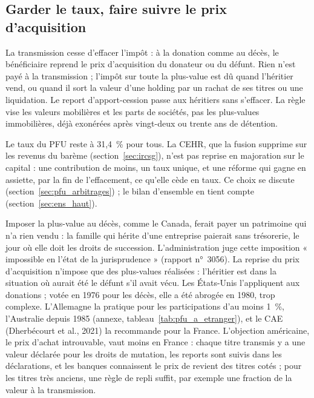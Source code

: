 \subsection{Garder le taux, faire suivre le prix d'acquisition}\label{sec:pfu_proposition}

La transmission cesse d'effacer l'impôt : à la donation comme au décès, le bénéficiaire reprend le prix
d'acquisition du donateur ou du défunt. Rien n'est payé à la transmission ; l'impôt sur toute la plus-value est dû
quand l'héritier vend, ou quand il sort la valeur d'une holding par un rachat de ses titres ou une liquidation. Le
report d'apport-cession passe aux héritiers sans s'effacer. La règle vise les valeurs mobilières et les parts de
sociétés, pas les plus-values immobilières, déjà exonérées après vingt-deux ou trente ans de détention.

Le taux du PFU reste à 31,4~\% pour tous. La CEHR, que la fusion supprime sur les revenus du barème
(section~\ref{sec:ircsg}), n'est pas reprise en majoration sur le capital : une contribution de moins, un taux
unique, et une réforme qui gagne en assiette, par la fin de l'effacement, ce qu'elle cède en taux. Ce choix se
discute (section~\ref{sec:pfu_arbitrages}) ; le bilan d'ensemble en tient compte (section~\ref{sec:ens_haut}).

Imposer la plus-value au décès, comme le Canada, ferait payer un patrimoine qui n'a rien vendu : la famille qui
hérite d'une entreprise paierait sans trésorerie, le jour où elle doit les droits de succession. L'administration
juge cette imposition « impossible en l'état de la jurisprudence » (rapport n°~3056). La reprise du prix
d'acquisition n'impose que des plus-values réalisées : l'héritier est dans la situation où aurait été le défunt s'il
avait vécu. Les États-Unis l'appliquent aux donations ; votée en 1976 pour les décès, elle a été abrogée en 1980,
trop complexe. L'Allemagne la pratique pour les participations d'au moins 1~\%, l'Australie depuis 1985
(annexe, tableau~\ref{tab:pfu_a_etranger}), et le CAE (Dherbécourt et al., 2021) la recommande pour la France. L'objection
américaine, le prix d'achat introuvable, vaut moins en France : chaque titre transmis y a une valeur déclarée pour
les droits de mutation, les reports sont suivis dans les déclarations, et les banques connaissent le prix de revient
des titres cotés ; pour les titres très anciens, une règle de repli suffit, par exemple une fraction de la valeur à
la transmission.

